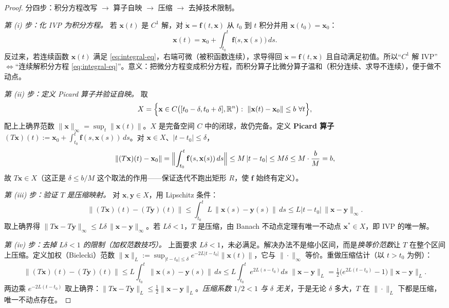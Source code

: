\begin{proof}
分四步：积分方程改写 $\to$ 算子自映 $\to$ 压缩 $\to$ 去掉技术限制。

\emph{第 (i) 步：化 IVP 为积分方程。} 若 $\mathbf{x}(t)$ 是 $C^1$ 解，对 $\dot{\mathbf{x}}=\mathbf{f}(t,\mathbf{x})$ 从 $t_0$ 到 $t$ 积分并用 $\mathbf{x}(t_0)=\mathbf{x}_0$：
\begin{equation}
  \mathbf{x}(t)=\mathbf{x}_0+\int_{t_0}^t\mathbf{f}\bigl(s,\mathbf{x}(s)\bigr)\,ds.
  \label{eq:integral-eq}
\end{equation}
反过来，若连续函数 $\mathbf{x}(t)$ 满足 \cref{eq:integral-eq}，右端可微（被积函数连续），求导得回 $\dot{\mathbf{x}}=\mathbf{f}(t,\mathbf{x})$ 且自动满足初值。所以“$C^1$ 解 IVP”$\iff$“连续解积分方程 \cref{eq:integral-eq}”。意义：把微分方程变成积分方程，而积分算子比微分算子温和（积分连续、求导不连续），便于做不动点。

\emph{第 (ii) 步：定义 Picard 算子并验证自映。} 取
\[
  X=\Bigl\{\mathbf{x}\in C\bigl([t_0-\delta,t_0+\delta],\mathbb{R}^n\bigr):\ \|\mathbf{x}(t)-\mathbf{x}_0\|\le b\ \forall t\Bigr\},
\]
配上上确界范数 $\|\mathbf{x}\|_\infty=\sup_t\|\mathbf{x}(t)\|$。$X$ 是完备空间 $C$ 中的闭球，故仍完备。定义 \textbf{Picard 算子} $(T\mathbf{x})(t):=\mathbf{x}_0+\int_{t_0}^t\mathbf{f}(s,\mathbf{x}(s))\,ds$。对 $\mathbf{x}\in X$、$|t-t_0|\le\delta$，
\[
  \|(T\mathbf{x})(t)-\mathbf{x}_0\|=\Bigl\|\int_{t_0}^t\mathbf{f}(s,\mathbf{x}(s))\,ds\Bigr\|\le M\,|t-t_0|\le M\delta\le M\cdot\frac{b}{M}=b,
\]
故 $T\mathbf{x}\in X$（这正是 $\delta\le b/M$ 这个取法的作用——保证迭代不跑出矩形 $R$，使 $\mathbf{f}$ 始终有定义）。

\emph{第 (iii) 步：验证 $T$ 是压缩映射。} 对 $\mathbf{x},\mathbf{y}\in X$，用 Lipschitz 条件：
\[
  \|(T\mathbf{x})(t)-(T\mathbf{y})(t)\|\le\int_{t_0}^t L\,\|\mathbf{x}(s)-\mathbf{y}(s)\|\,ds\le L|t-t_0|\,\|\mathbf{x}-\mathbf{y}\|_\infty.
\]
取上确界得 $\|T\mathbf{x}-T\mathbf{y}\|_\infty\le L\delta\,\|\mathbf{x}-\mathbf{y}\|_\infty$。若 $L\delta<1$，$T$ 是压缩，由 Banach 不动点定理有唯一不动点 $\mathbf{x}^*\in X$，即 IVP 的唯一解。

\emph{第 (iv) 步：去掉 $L\delta<1$ 的限制（加权范数技巧）。} 上面要求 $L\delta<1$，未必满足。解决办法不是缩小区间，而是\emph{换等价范数}让 $T$ 在整个区间上压缩。定义加权（Bielecki）范数 $\|\mathbf{x}\|_L:=\sup_{|t-t_0|\le\delta}e^{-2L|t-t_0|}\|\mathbf{x}(t)\|$，它与 $\|\cdot\|_\infty$ 等价。重做压缩估计（以 $t>t_0$ 为例）：
\[
  \|(T\mathbf{x})(t)-(T\mathbf{y})(t)\|\le L\int_{t_0}^t\|\mathbf{x}(s)-\mathbf{y}(s)\|\,ds\le L\int_{t_0}^t e^{2L(s-t_0)}ds\;\|\mathbf{x}-\mathbf{y}\|_L=\tfrac12\bigl(e^{2L(t-t_0)}-1\bigr)\|\mathbf{x}-\mathbf{y}\|_L.
\]
两边乘 $e^{-2L(t-t_0)}$ 取上确界：$\|T\mathbf{x}-T\mathbf{y}\|_L\le\tfrac12\|\mathbf{x}-\mathbf{y}\|_L$。\emph{压缩系数 $1/2<1$ 与 $\delta$ 无关}，于是无论 $\delta$ 多大，$T$ 在 $\|\cdot\|_L$ 下都是压缩，唯一不动点存在。
\end{proof}

